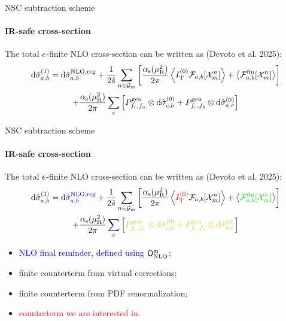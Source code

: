 
\begin{frame}{NSC subtraction scheme}
  \framesubtitle{IR-safe cross-section}

  The total $ \epsilon $-finite NLO cross-section can be written as (Devoto et al. 2025):
  \begin{multline*}
    \mathrm{d}\hat{\sigma}_{a,b}^{(1)} = \mathrm{d}\hat{\sigma}_{a,b}^\text{NLO,reg} + \frac{1}{2\hat{s}} \sum_{n \in \mathcal{G}_m} \left[ \frac{\alpha_\text{s}(\mu_\text{R}^2)}{2\pi} \left\langle I_\text{T}^{(0)} \mathcal{F}_{a,b}[\mathcal{X}^{n}_{m}] \right\rangle + \left\langle \mathcal{F}_{a,b}^\text{fin}[\mathcal{X}^{n}_{m}] \right\rangle \right] \\
    + \frac{\alpha_\text{s}(\mu_\text{R}^2)}{2\pi} \sum_c \left[ P^\text{gen}_{f_c , f_a} \otimes \mathrm{d}\hat{\sigma}^{(0)}_{c,b} + P^\text{gen}_{f_c , f_b} \otimes \mathrm{d}\hat{\sigma}^{(0)}_{a,c} \right]
  \end{multline*}

  \vspace{6.41em}

\end{frame}


\begin{frame}[noframenumbering]{NSC subtraction scheme}
  \framesubtitle{IR-safe cross-section}

  The total $ \epsilon $-finite NLO cross-section can be written as (Devoto et al. 2025):
  \begin{multline*}
    \dd\pcs_{a,b}^{(1)} = \textcolor{blue}{\dd\pcs_{a,b}^\text{NLO,reg}} + \frac{1}{2\hat{s}} \sum_{n \in \en_m} \left[ \frac{\rcr}{2\pi} \ips{\textcolor{red}{\ito^{(0)}} \flm_{a,b}[\fs{n}{m}]} + \ips{\textcolor{green!80!black}{\flm_{a,b}^\text{fin}[\fs{n}{m}]}} \right] \\
    + \frac{\rcr}{2\pi} \sum_c \left[ \textcolor{yellow!80!black}{\fap_{f_c , f_a} \otimes \dd\pcs^{(0)}_{c,b} + \fap_{f_c , f_b} \otimes \dd\pcs^{(0)}_{a,c}} \right]
  \end{multline*}
  \begin{itemize}[<+->]
    \item \textcolor{blue}{NLO final reminder, defined using $ \mathsf{O}_\text{NLO}^{\mathfrak{m}} $};
    \item \textcolor{green!80!black}{finite counterterm from virtual corrections};
    \item \textcolor{yellow!80!black}{finite counterterm from PDF renormalization};
    \item \textcolor{red}{counterterm we are interested in}.
  \end{itemize}

\end{frame}

